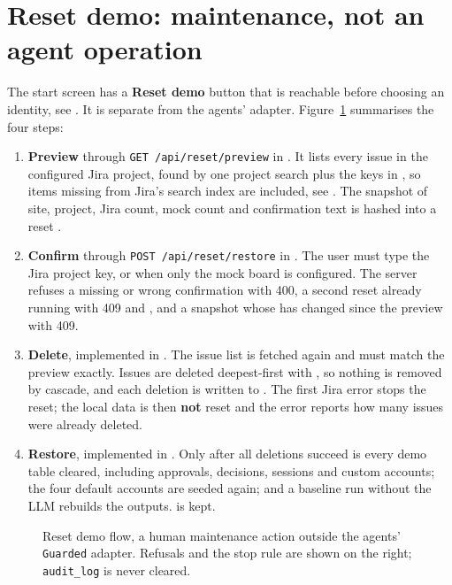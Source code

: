 \section{Reset demo: maintenance, not an agent operation}
\label{sec:reset}

The start screen has a \textbf{Reset demo} button that is reachable before choosing an identity, see . It is separate from the agents'  adapter. Figure~\ref{fig:reset} summarises the four steps:

\begin{enumerate}[leftmargin=*,itemsep=2pt]
  \item \textbf{Preview} through \texttt{GET /api/reset/preview} in . It lists every issue in the configured Jira project, found by one project search plus the keys in , so items missing from Jira's search index are included, see . The snapshot of site, project, Jira count, mock count and confirmation text is hashed into a reset .
  \item \textbf{Confirm} through \texttt{POST /api/reset/restore} in . The user must type the Jira project key, or  when only the mock board is configured. The server refuses a missing or wrong confirmation with 400, a second reset already running with 409 and , and a snapshot whose  has changed since the preview with 409.
  \item \textbf{Delete}, implemented in . The issue list is fetched again and must match the preview exactly. Issues are deleted deepest-first with , so nothing is removed by cascade, and each deletion is written to . The first Jira error stops the reset; the local data is then \textbf{not} reset and the error reports how many issues were already deleted.
  \item \textbf{Restore}, implemented in . Only after all deletions succeed is every demo table cleared, including approvals, decisions, sessions and custom accounts; the four default accounts are seeded again; and a baseline run without the LLM rebuilds the outputs.  is kept.
\end{enumerate}

\begin{figure}[htbp]
  \centering
  \resizebox{0.9\textwidth}{!}{}
  \caption[Reset demo flow with its refusals]{Reset demo flow, a human maintenance action outside the agents' \texttt{Guarded} adapter. Refusals and the stop rule are shown on the right; \texttt{audit\_log} is never cleared.}
  \label{fig:reset}
\end{figure}

